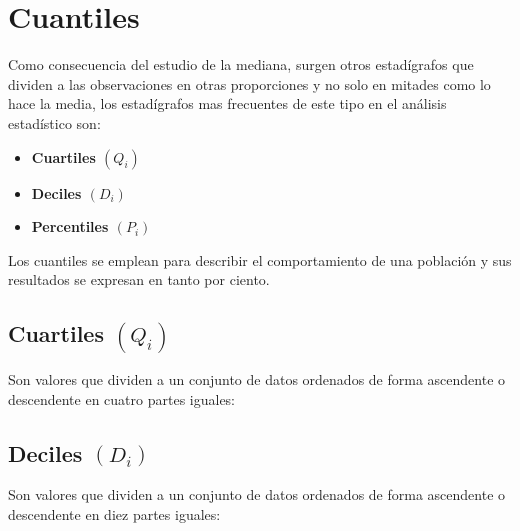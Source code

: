 \section{Cuantiles}
Como consecuencia del estudio de la mediana, surgen otros estadígrafos que dividen a las observaciones en otras proporciones y no solo en mitades como lo hace la media, los estadígrafos mas frecuentes de este tipo en el análisis estadístico son:
\begin{itemize}
\item \textbf{Cuartiles $(Q_i)$}
\item \textbf{Deciles $(D_i)$}
\item \textbf{Percentiles $(P_i)$}
\end{itemize}
Los cuantiles se emplean para describir el comportamiento de una población y sus resultados se expresan en tanto por ciento.
\subsection{Cuartiles $(Q_i)$}
Son valores que dividen a un conjunto de datos ordenados de forma ascendente o descendente en cuatro partes iguales:
\begin{center}
\end{center}
\subsection{Deciles $(D_i)$}
Son valores que dividen a un conjunto de datos ordenados de forma ascendente o descendente en diez partes iguales:
\begin{center}
\end{center}

